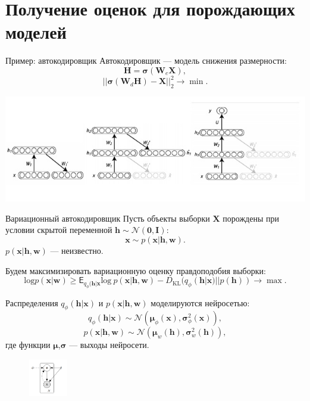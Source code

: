 \documentclass[10pt,pdf,utf8,russian,aspectratio=169]{beamer}
\begin{document}
\section{Получение оценок для порождающих моделей}
\begin{frame}{Пример: автокодировщик}
Автокодировщик --- модель снижения размерности:
$$
	\mathbf{H} = \boldsymbol{\sigma}(\mathbf{W}_e \mathbf{X}),
$$
$$
	||\boldsymbol{\sigma}(\mathbf{W}_d\mathbf{H}) - \mathbf{X}||_2^2 \to \min.
$$

\includegraphics[width=\textwidth]{bengio.png}
\end{frame}



\begin{frame}{Вариационный автокодировщик}
Пусть объекты выборки $\mathbf{X}$ порождены при условии скрытой переменной $\mathbf{h} \sim \mathcal{N}(\mathbf{0}, \mathbf{I})$:
$$
\mathbf{x} \sim p(\mathbf{x}|\mathbf{h}, \mathbf{w}).
$$
$p(\mathbf{x}|\mathbf{h}, \mathbf{w})$ --- неизвестно.

Будем максимизировать вариационную оценку правдоподобия выборки:
$$
\text{log}p(\mathbf{x}|\mathbf{w}) \geq \mathsf{E}_{q_\phi(\mathbf{h}|\mathbf{x}}\text{log}~p(\mathbf{x}|\mathbf{h}, \mathbf{w}) - D_\text{KL}(q_\phi(\mathbf{h}|\mathbf{x})||p(\mathbf{h})) \to \max.
$$

Распределения $q_\phi(\mathbf{h}|\mathbf{x})$ и $p(\mathbf{x}|\mathbf{h}, \mathbf{w})$ моделируются нейросетью:
$$
q_\phi(\mathbf{h}|\mathbf{x}) \sim \mathcal{N}(\boldsymbol{\mu}_\phi(\mathbf{x}),\boldsymbol{\sigma}_\phi^2(\mathbf{x})), 
$$
$$
p(\mathbf{x}|\mathbf{h}, \mathbf{w}) \sim \mathcal{N}(\boldsymbol{\mu}_w(\mathbf{h}),\boldsymbol{\sigma}_w^2(\mathbf{h})),
$$
где функции $\boldsymbol{\mu}$,$\boldsymbol{\sigma}$ --- выходы нейросети.\\
\begin{figure}
  \centering
\includegraphics[width=0.15\textwidth]{graph.png}
\end{figure}
\end{frame}
\end{document}
